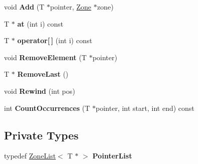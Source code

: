 \begin{DoxyCompactItemize}
\item 
void {\bfseries Add} (T $\ast$pointer, \hyperlink{classv8_1_1internal_1_1_zone}{Zone} $\ast$zone)\hypertarget{classv8_1_1internal_1_1_small_pointer_list_a73fa62b423378831be588543ee08eb4c}{}\label{classv8_1_1internal_1_1_small_pointer_list_a73fa62b423378831be588543ee08eb4c}

\item 
T $\ast$ {\bfseries at} (int i) const \hypertarget{classv8_1_1internal_1_1_small_pointer_list_a701a85d219fd2f10e0d41699ac51be1a}{}\label{classv8_1_1internal_1_1_small_pointer_list_a701a85d219fd2f10e0d41699ac51be1a}

\item 
T $\ast$ {\bfseries operator\mbox{[}$\,$\mbox{]}} (int i) const \hypertarget{classv8_1_1internal_1_1_small_pointer_list_a8cc85a975217e7c0fedc49698d8b7a36}{}\label{classv8_1_1internal_1_1_small_pointer_list_a8cc85a975217e7c0fedc49698d8b7a36}

\item 
void {\bfseries Remove\+Element} (T $\ast$pointer)\hypertarget{classv8_1_1internal_1_1_small_pointer_list_ae9243336248efac953019f9af438869e}{}\label{classv8_1_1internal_1_1_small_pointer_list_ae9243336248efac953019f9af438869e}

\item 
T $\ast$ {\bfseries Remove\+Last} ()\hypertarget{classv8_1_1internal_1_1_small_pointer_list_a400981534ca6b80a29dd47e4c1a24a26}{}\label{classv8_1_1internal_1_1_small_pointer_list_a400981534ca6b80a29dd47e4c1a24a26}

\item 
void {\bfseries Rewind} (int pos)\hypertarget{classv8_1_1internal_1_1_small_pointer_list_a5477076c9179ed02a0cd770d4010bdbd}{}\label{classv8_1_1internal_1_1_small_pointer_list_a5477076c9179ed02a0cd770d4010bdbd}

\item 
int {\bfseries Count\+Occurrences} (T $\ast$pointer, int start, int end) const \hypertarget{classv8_1_1internal_1_1_small_pointer_list_a0511a5d5b96d6b2234074c27dd2a52d2}{}\label{classv8_1_1internal_1_1_small_pointer_list_a0511a5d5b96d6b2234074c27dd2a52d2}

\end{DoxyCompactItemize}
\subsection*{Private Types}
\begin{DoxyCompactItemize}
\item 
typedef \hyperlink{classv8_1_1internal_1_1_zone_list}{Zone\+List}$<$ T $\ast$ $>$ {\bfseries Pointer\+List}\hypertarget{classv8_1_1internal_1_1_small_pointer_list_a14a0bf1532653ca3f467621a05b774b9}{}\label{classv8_1_1internal_1_1_small_pointer_list_a14a0bf1532653ca3f467621a05b774b9}

\end{DoxyCompactItemize}

